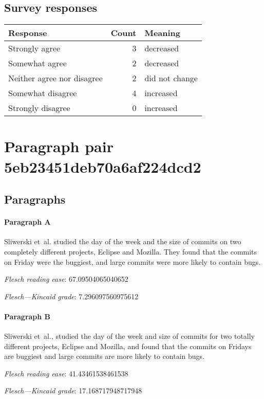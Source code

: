 \subsection{Survey responses}
\begin{tabular}{lrl}
\toprule
          \textbf{Response} &  \textbf{Count} & \textbf{Meaning} \\
\midrule
             Strongly agree &               3 &        decreased \\
             Somewhat agree &               2 &        decreased \\
 Neither agree nor disagree &               2 &   did not change \\
          Somewhat disagree &               4 &        increased \\
          Strongly disagree &               0 &        increased \\
\bottomrule
\end{tabular}

\section{Paragraph pair 5eb23451deb70a6af224dcd2}
\subsection{Paragraphs}
\paragraph{Paragraph A}
Sliwerski et al. studied the day of the week and the size of commits on two completely different projects, Eclipse and Mozilla. They found that the commits on Friday were the buggiest, and large commits were more likely to contain bugs.\par\medskip\emph{Flesch reading ease}: 67.09504065040652\par\emph{Flesch---Kincaid grade}: 7.296097560975612

\paragraph{Paragraph B}
Sliwerski et al., studied the day of the week and size of commits for two totally different projects, Eclipse and Mozilla, and found that the commits on Fridays are buggiest and large commits are more likely to contain bugs.\par\medskip\emph{Flesch reading ease}: 41.43461538461538\par\emph{Flesch---Kincaid grade}: 17.168717948717948

